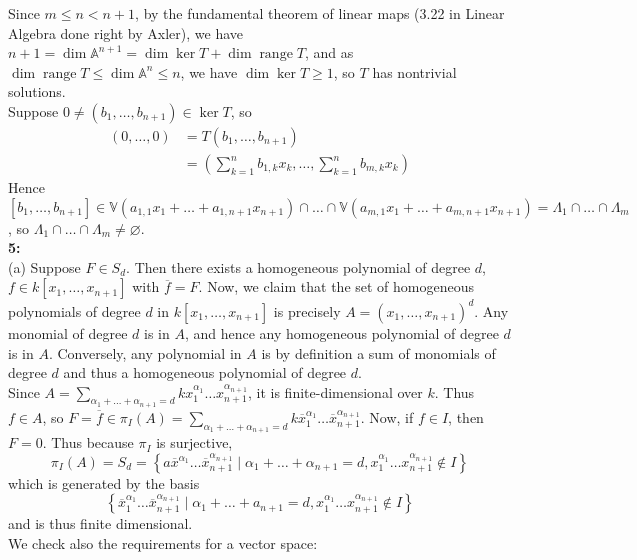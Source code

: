 \documentclass[a4paper]{article}
\DeclareMathOperator{\range}{range}
\begin{document}
Since
$m \le n < n+1$, by the fundamental theorem of
linear maps (3.22 in Linear Algebra done right by Axler), we have $n+1= \dim \mathbb{A}^{n+1} =
\dim \ker T + \dim \range T$, and as $\dim \range T \le
\dim \mathbb{A}^{n} \le n$, we have
$\dim \ker T \ge 1$, so $T$ has nontrivial solutions.\\
Suppose
 $0\neq (b_1, \ldots, b_{n+1}) \in \ker T$, so
  \begin{align*}
      (0,\ldots,0)
     &=T(b_1, \ldots, b_{n+1})\\
     &= \left( \sum_{k=1}^{n} b_{1,k}x_k, \ldots,
     \sum_{k=1}^{n} b_{m,k}x_k \right) 
 \end{align*}
Hence 
$\left[ b_1, \ldots, b_{n+1} \right] 
\in \mathbb{V}(a_{1,1}x_1+ \ldots + a_{1,n+1}x_{n+1})
\cap \ldots \cap \mathbb{V}\left( a_{m,1}x_1 + \ldots + a_{m,n+1}x_{n+1} \right) 
= \Lambda_1 \cap \ldots \cap \Lambda_m$, so
$\Lambda_1 \cap \ldots \cap \Lambda_m \neq \varnothing$.\\
\linebreak
\textbf{5:}\\
(a) Suppose $F \in S_d$. Then there exists
a homogeneous polynomial of degree $d$, $f \in k\left[ x_1, \ldots, x_{n+1} \right] $ with
$\overline{f} = F$. Now, we claim that the set of homogeneous polynomials of
degree $d$ in $k\left[ x_1,\ldots, x_{n+1} \right] $ is precisely
$A = (x_1, \ldots, x_{n+1})^{d}$. Any monomial of degree $d$ is in $A$, and
hence any homogeneous polynomial of degree $d$ is in $A$. Conversely, any
polynomial in $A$ is by definition a sum of monomials of degree $d$ and thus
a homogeneous polynomial of degree $d$.\\
Since
$A = \sum_{\alpha_1 + \ldots + \alpha_{n+1} = d} k
x_1^{\alpha_1} \ldots x_{n+1}^{\alpha_{n+1}}$, it is finite-dimensional over
$k$. Thus $f \in A$, so
$ F=\overline{f} \in \pi_I (A) =
\sum_{\alpha_1 + \ldots + \alpha_{n+1} = d}
k \overline{x}_1^{\alpha_1} \ldots \overline{x}_{n+1}^{\alpha_{n+1}}$. Now,
if $f \in I$, then $F = 0$. Thus because $\pi_I$ is surjective,
 \[
\pi_I (A) = S_d = \left\{ a \overline{x}^{\alpha_1} \ldots \overline{x}_{n+1}^{\alpha_{n+1}}
      \mid \alpha_1 + \ldots + \alpha_{n+1} = d,
      x_1^{\alpha_1} \ldots x_{n+1}^{\alpha_{n+1}} \not\in  I
\right\} \]
 which is generated by the basis
\[
    \left\{ \overline{x}_1^{\alpha_1} \ldots \overline{x}_{n+1}^{\alpha_{n+1}}
 \mid \alpha_1 + \ldots + a_{n+1} = d,
x_1^{\alpha_1}\ldots x_{n+1}^{\alpha_{n+1}}\not\in  I \right\} 
\] 
and is thus finite dimensional.\\
We check also the requirements for a vector space:\\
\end{document}

